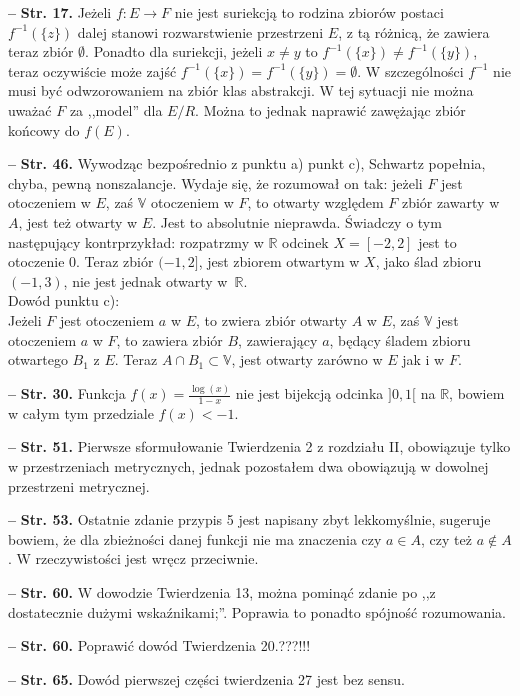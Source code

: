\documentclass[a4paper]{article}
\newcommand{\mb}{\mathbb}
\newcommand{\R}{\mb{R}}
\newcommand{\V}{\mb{V}}
\newcommand{\fr}{\frac}
\newcommand{\ra}{\rightarrow}
\newcommand{\tb}{\textbf}
\newcommand{\noi}{\noindent}
\newcommand{\start}{\noi \tb{--} {}}
\newcommand{\Str}[1]{\tb{Str. #1.}}
\begin{document}
\start \Str{17} Jeżeli $f : E \ra F$ nie jest suriekcją to rodzina
zbiorów postaci $f^{ -1 } ( \{ z\} )$ dalej stanowi rozwarstwienie
przestrzeni $E$, z tą różnicą, że zawiera teraz zbiór $\emptyset$.
Ponadto dla suriekcji, jeżeli $x \neq y$ to
$f^{ -1 }( \{ x \} ) \neq f^{ -1 } ( \{ y\} )$, teraz oczywiście może
zajść $f^{ -1 }( \{ x \} ) = f^{ -1 }( \{ y \} ) = \emptyset$. W
szczególności $f^{ -1 }$ nie musi być odwzorowaniem na zbiór klas
abstrakcji. W tej sytuacji nie można uważać $F$ za ,,model'' dla
$E / R$. Można to jednak naprawić zawężając zbiór końcowy do $f( E )$.

\start \Str{46} Wywodząc bezpośrednio z punktu a) punkt c), Schwartz
popełnia, chyba, pewną nonszalancje. Wydaje się, że rozumował on tak:
jeżeli $F$ jest otoczeniem w $E$, zaś $\V$ otoczeniem w $F$, to
otwarty względem $F$ zbiór zawarty w $A$, jest też otwarty w $E$. Jest
to absolutnie nieprawda. Świadczy o tym następujący kontrprzykład:
rozpatrzmy w $\R$ odcinek $X = [ -2, 2 ]$ jest to otoczenie 0. Teraz
zbiór $( -1, 2 ]$, jest zbiorem otwartym
w $X$, jako ślad zbioru $( -1, 3 )$, nie jest jednak otwarty w~$\R$.\\
Dowód punktu c):\\
Jeżeli $F$ jest otoczeniem $a$ w $E$, to zwiera zbiór otwarty $A$ w
$E$, zaś $\V$ jest otoczeniem $a$ w $F$, to zawiera zbiór $B$,
zawierający $a$, będący śladem zbioru otwartego $B_{ 1 }$ z $E$. Teraz
$A \cap B_{ 1 } \subset \V$, jest otwarty zarówno w $E$ jak i w $F$.

\start \Str{30} Funkcja $f( x ) = \fr{ \log( x ) }{ 1 - x }$ nie jest
bijekcją odcinka $] 0, 1 [$ na $\R$, bowiem w całym tym przedziale
$f( x ) < -1$.

\start \Str{51} Pierwsze sformułowanie Twierdzenia 2 z rozdziału II,
obowiązuje tylko w przestrzeniach metrycznych, jednak pozostałem dwa
obowiązują w dowolnej przestrzeni metrycznej.

\start \Str{53} Ostatnie zdanie przypis 5 jest napisany zbyt
lekkomyślnie, sugeruje bowiem, że dla zbieżności danej funkcji nie ma
znaczenia czy $a \in A$, czy też $a \notin A$. W rzeczywistości jest
wręcz przeciwnie.
  
\start \Str{60} W dowodzie Twierdzenia 13, można pominąć zdanie po ,,z
dostatecznie dużymi wskaźnikami;''. Poprawia to ponadto spójność
rozumowania.
  
\start \Str{60} Poprawić dowód Twierdzenia 20.???!!!

\start \Str{65} Dowód pierwszej części twierdzenia 27 jest bez sensu.
\end{document}
